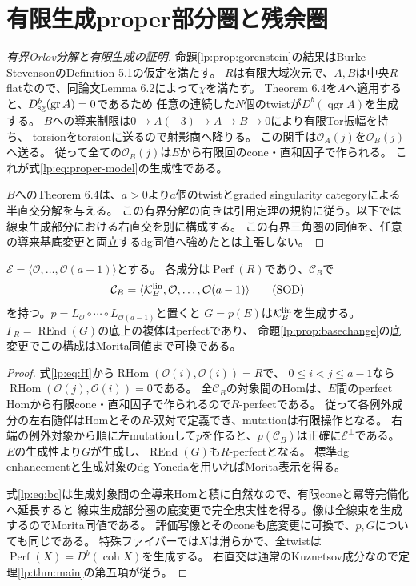 \section{有限生成proper部分圏と残余圏}
\label{lp:sec:proper}
\begin{proof}[有界Orlov分解と有限生成の証明]
命題\ref{lp:prop:gorenstein}の結果はBurke--StevensonのDefinition 5.1の仮定を満たす。
$R$は有限大域次元で、$A,B$は中央$R$-flatなので、同論文Lemma 6.2によって$\chi$を満たす。
Theorem 6.4を$A$へ適用すると、$D_{\rm sg}^b(\operatorname{gr}A)=0$であるため
任意の連続した$N$個のtwistが$D^b(\operatorname{qgr}A)$を生成する。
$B$への導来制限は$0\to A(-3)\to A\to B\to0$により有限Tor振幅を持ち、
torsionをtorsionに送るので射影商へ降りる。
この関手は$\mathcal O_A(j)$を$\mathcal O_B(j)$へ送る。
従って全ての$\mathcal O_B(j)$は$E$から有限回のcone・直和因子で作られる。
これが式\eqref{lp:eq:proper-model}の生成性である。

$B$へのTheorem 6.4は、$a>0$より$a$個のtwistとgraded singularity categoryによる半直交分解を与える。
この有界分解の向きは引用定理の規約に従う。以下では線束生成部分における右直交を別に構成する。
この有界三角圏の同値を、任意の導来基底変更と両立するdg同値へ強めたとは主張しない。
\end{proof}

\begin{proposition}[properな残余dg代数]\label{lp:prop:residual}
$\mathcal E=\langle\mathcal O,\ldots,\mathcal O(a-1)\rangle$とする。
各成分は$\operatorname{Perf}(R)$であり、$\mathcal C_B$で
\[
 \mathcal C_B=\langle\mathcal K_B^{\rm lin},\mathcal O,\ldots,\mathcal O(a-1)\rangle
 \tag{SOD}\label{lp:eq:sod}
\]
を持つ。$p=L_{\mathcal O}\circ\cdots\circ L_{\mathcal O(a-1)}$と置くと
$G=p(E)$は$\mathcal K_B^{\rm lin}$を生成する。
$\Gamma_R=\operatorname{REnd}(G)$の底上の複体はperfectであり、
命題\ref{lp:prop:basechange}の底変更でこの構成はMorita同値まで可換である。
\end{proposition}
\begin{proof}
式\eqref{lp:eq:H}から$\operatorname{RHom}(\mathcal O(i),\mathcal O(i))=R$で、
$0\le i<j\le a-1$なら$\operatorname{RHom}(\mathcal O(j),\mathcal O(i))=0$である。
全$\mathcal C_B$の対象間のHomは、$E$間のperfect Homから有限cone・直和因子で作られるので$R$-perfectである。
従って各例外成分の左右随伴はHomとその$R$-双対で定義でき、mutationは有限操作となる。
右端の例外対象から順に左mutationして$p$を作ると、$p(\mathcal C_B)$は正確に$\mathcal E^\perp$である。
$E$の生成性より$G$が生成し、$\operatorname{REnd}(G)$も$R$-perfectとなる。
標準dg enhancementと生成対象のdg Yonedaを用いればMorita表示を得る\cite[Theorem 3.8]{LP-Keller}。

式\eqref{lp:eq:bc}は生成対象間の全導来Homと積に自然なので、有限coneと冪等完備化へ延長すると
線束生成部分圏の底変更で完全忠実性を得る。像は全線束を生成するのでMorita同値である。
評価写像とそのconeも底変更に可換で、$p,G$についても同じである。
特殊ファイバーでは$X$は滑らかで、全twistは$\operatorname{Perf}(X)=D^b(\operatorname{coh}X)$を生成する。
右直交は通常のKuznetsov成分なので定理\ref{lp:thm:main}の第五項が従う。
\end{proof}

